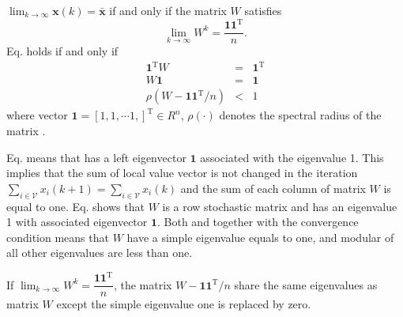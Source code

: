 \begin{thm}
\cite{Xiao2004}\textup{\label{thm:convergence condition}$\lim_{k\rightarrow\infty}\mathbf{x}(k)=\mathbf{\bar{x}}$}
if and only if the matrix $W$ satisfie\textup{s
\begin{equation}
\lim_{k\rightarrow\infty}W^{k}=\dfrac{\mathbf{11}^{\mathrm{T}}}{n}.\label{eq:convege condition W}
\end{equation}
}Eq. holds if and only if
\begin{eqnarray}
\mathbf{1}^{\mathrm{T}}W & = & \mathbf{1}^{\mathrm{T}}\label{eq: Converge condition W_Left}\\
W\mathbf{1} & = & \mathbf{1}\label{eq: Converge condition W_right}\\
\rho\left(W-\mathbf{11}^{\mathrm{T}}/n\right) & < & 1\label{eq:Converge cond. rhu<1}
\end{eqnarray}
where vector $\mathbf{1}=[1,1,\cdots1,]^{\mathrm{T}}\in R^{n}$, $\rho\left(\cdot\right)$
denotes the spectral radius of the matrix .
\end{thm}
Eq. means that has a left
eigenvector $\mathbf{1}$ associated with the eigenvalue 1. This implies
that the sum of local value vector is not changed in the iteration
$\sum_{i\in\mathcal{V}}x_{i}\left(k+1\right)=\sum_{i\in\mathcal{V}}x_{i}\left(k\right)$
and the sum of each column of matrix $W$ is equal to one. Eq.
shows that $W$ is a row stochastic matrix and has an eigenvalue 1
with associated eigenvector $\mathbf{1}$. Both 
and  together with the
convergence condition  means that
$W$ have a simple eigenvalue equals to one, and modular of all other
eigenvalues are less than one.
\begin{lem}
\textup{\label{thm:Share the eigenvalues}If $\lim_{k\rightarrow\infty}W^{k}=\dfrac{\mathbf{11}^{\mathrm{T}}}{n}$,
the matrix $W-\mathbf{11}^{\mathrm{T}}/n$ share the same eigenvalues
as matrix $W$ except the simple eigenvalue one is replaced by zero.}\end{lem}
